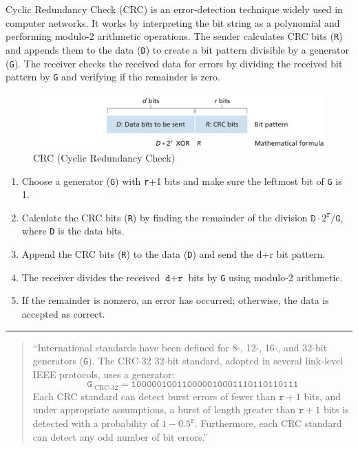 Cyclic Redundancy Check (CRC) is an error-detection technique widely used in computer networks. It works by interpreting the bit string as a polynomial and performing modulo-2 arithmetic operations. The sender calculates CRC bits (\texttt{R}) and appends them to the data (\texttt{D}) to create a bit pattern divisible by a generator (\texttt{G}). The receiver checks the received data for errors by dividing the received bit pattern by \texttt{G} and verifying if the remainder is zero.

\begin{figure}[H]
    \centering
    \includegraphics[width = 0.85\linewidth]{img/5/CRC.png}
    \caption{CRC (Cyclic Redundancy Check) \cite{Kurose2017}}
    \label{fig:CRC}
\end{figure}

\begin{enumerate}
    \item Choose a generator (\texttt{G}) with \texttt{r}+1 bits and make sure the leftmost bit of \texttt{G} is 1.
    \item Calculate the CRC bits (\texttt{R}) by finding the remainder of the division $\texttt{D} \cdot 2^\texttt{r}/\texttt{G}$, where \texttt{D} is the data bits.
    \item Append the CRC bits (\texttt{R}) to the data (\texttt{D}) and send the d+r bit pattern.
    \item The receiver divides the received $\texttt{d}+\texttt{r}$ bits by \texttt{G} using modulo-2 arithmetic.
    \item If the remainder is nonzero, an error has occurred; otherwise, the data is accepted as correct.
\end{enumerate}

\hrule

\begin{quote}
    \noindent ``International standards have been defined for 8-, 12-, 16-, and 32-bit generators (\texttt{G}). The CRC-32 32-bit standard, adopted in several link-level IEEE protocols, uses a generator:
    $$
        \texttt{G}_\text{ CRC-32} = \texttt{100000100110000010001110110110111}
    $$
    \noindent Each CRC standard can detect burst errors of fewer than $\texttt{r}+1$ bits, and under appropriate assumptions, a burst of length greater than $\texttt{r}+1$ bits is detected with a probability of $1 - 0.5^\texttt{r}$. Furthermore, each CRC standard can detect any odd number of bit errors.''\cite{Kurose2017}
\end{quote}

